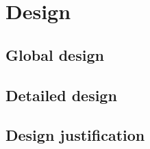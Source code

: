 \documentclass[../main.tex]{subfiles}
\begin{document}
\pagebreak
\section{Design}

    \subsection{Global design}

    \subsection{Detailed design}

    \subsection{Design justification}
\end{document}
